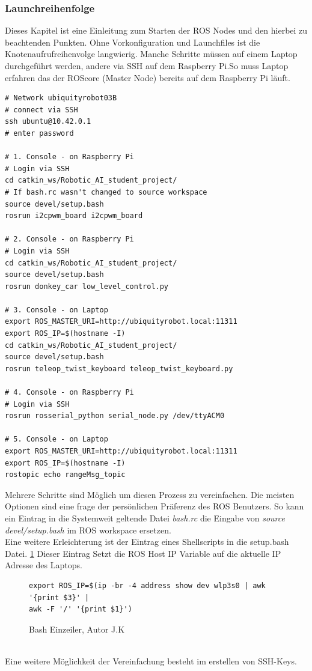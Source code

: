 \documentclass[conference]{IEEEtran}
\begin{document}
\pagebreak
\subsubsection{Launchreihenfolge}%

Dieses Kapitel ist eine Einleitung zum Starten der ROS Nodes und den 
hierbei zu beachtenden Punkten. Ohne Vorkonfiguration und Launchfiles ist 
die Knotenaufrufreihenvolge langwierig. Manche Schritte müssen auf einem 
Laptop durchgeführt werden, andere via SSH auf dem Raspberry Pi.So muss 
Laptop erfahren das der ROScore (Master Node) bereits auf dem Raspberry 
Pi läuft.

\begin{verbatim}
# Network ubiquityrobot03B
# connect via SSH
ssh ubuntu@10.42.0.1
# enter password

# 1. Console - on Raspberry Pi
# Login via SSH
cd catkin_ws/Robotic_AI_student_project/
# If bash.rc wasn't changed to source workspace
source devel/setup.bash
rosrun i2cpwm_board i2cpwm_board

# 2. Console - on Raspberry Pi
# Login via SSH
cd catkin_ws/Robotic_AI_student_project/
source devel/setup.bash
rosrun donkey_car low_level_control.py

# 3. Console - on Laptop 
export ROS_MASTER_URI=http://ubiquityrobot.local:11311
export ROS_IP=$(hostname -I)
cd catkin_ws/Robotic_AI_student_project/
source devel/setup.bash
rosrun teleop_twist_keyboard teleop_twist_keyboard.py

# 4. Console - on Raspberry Pi
# Login via SSH
rosrun rosserial_python serial_node.py /dev/ttyACM0

# 5. Console - on Laptop
export ROS_MASTER_URI=http://ubiquityrobot.local:11311
export ROS_IP=$(hostname -I)
rostopic echo rangeMsg_topic
\end{verbatim}

Mehrere Schritte sind Möglich um diesen Prozess zu vereinfachen. Die 
meisten Optionen sind eine frage der persönlichen Präferenz des ROS 
Benutzers.  So kann ein Eintrag in die Systemweit geltende Datei 
\textit{bash.rc} die Eingabe von \textit{source devel/setup.bash} im ROS 
workspace ersetzen. \\
Eine weitere Erleichterung ist der Eintrag eines Shellscripts in die 
setup.bash Datei. \ref{Einzeiler} Dieser Eintrag Setzt die ROS Host IP 
Variable auf die aktuelle IP Adresse des Laptops.
\begin{figure}
	\centering
	\begin{verbatim}
export ROS_IP=$(ip -br -4 address show dev wlp3s0 | awk '{print $3}' | 
awk -F '/' '{print $1}')
\end{verbatim}
\label{Einzeiler}
\caption{Bash Einzeiler, Autor J.K }
\end{figure}
\\
Eine weitere Möglichkeit der Vereinfachung besteht im erstellen von 
SSH-Keys. 
\end{document}
